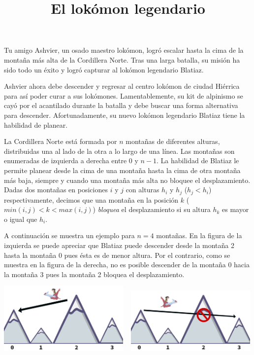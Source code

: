 \documentclass{oci}
\title{El lokómon legendario}
\begin{document}
\begin{problemDescription}

Tu amigo Ashvier, un osado maestro lokómon, logró escalar hasta la cima de la montaña más alta de
la Cordillera Norte.
Tras una larga batalla, su misión ha sido todo un éxito y logró capturar al lokómon legendario Blatiaz.

Ashvier ahora debe descender y regresar al centro lokómon de ciudad Hiérrica para así poder curar
a sus lokómones.
Lamentablemente, su kit de alpinismo se cayó por el acantilado durante la batalla y debe buscar
una forma alternativa para descender.
Afortunadamente, su nuevo lokómon legendario Blatiaz tiene la habilidad de planear.

La Cordillera Norte está formada por $n$ montañas de diferentes alturas, distribuidas una al lado
de la otra a lo largo de una línea.
Las montañas son enumeradas de izquierda a derecha entre 0 y $n-1$.
La habilidad de Blatiaz le permite planear desde la cima de una montaña
hasta la cima de otra montaña más baja, siempre y cuando una montaña más alta no bloquee
el desplazamiento.
Dadas dos montañas en posiciones $i$ y $j$ con alturas $h_i$ y $h_j$ ($h_j < h_i$) respectivamente,
decimos que una montaña en la posición $k$ ($min(i, j) < k < max(i, j)$) \emph{bloquea} el
desplazamiento si su altura $h_k$ es mayor o igual que $h_i$.


A continuación se muestra un ejemplo para $n=4$ montañas.
En la figura de la izquierda se puede apreciar que Blatiaz puede descender desde la montaña 2
hasta la montaña 0 pues ésta es de menor altura.
Por el contrario, como se muestra en la figura de la derecha, no es posible descender de la
montaña 0 hacia la montaña 3 pues la montaña 2 bloquea el desplazamiento.

\begin{center}
\includegraphics[width=0.48\textwidth]{allowed.png}
~
\includegraphics[width=0.48\textwidth]{disallowed.png}
\end{center}


\end{problemDescription}
\end{document}
